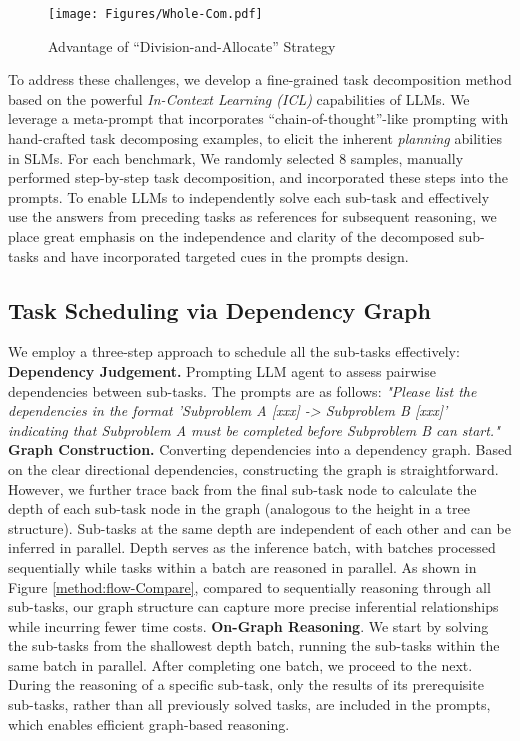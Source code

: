 \begin{figure}
    \centering
    \texttt{[image: Figures/Whole-Com.pdf]}
    \vspace{-6mm}
    \caption{Advantage of ``Division-and-Allocate'' Strategy}
    \label{fig:compare}
    \vspace{-5mm}
\end{figure}

To address these challenges, we develop a fine-grained task decomposition method based on the powerful \textit{In-Context Learning (ICL)} capabilities of LLMs. We leverage a meta-prompt that incorporates ``chain-of-thought''-like prompting with hand-crafted task decomposing examples, to elicit the inherent \emph{planning} abilities in SLMs. 
For each benchmark, We randomly selected 8 samples, manually performed step-by-step task decomposition, and incorporated these steps into the prompts.
To enable LLMs to independently solve each sub-task and effectively use the answers from preceding tasks as references for subsequent reasoning, we place great emphasis on the independence and clarity of the decomposed sub-tasks and have incorporated targeted cues in the prompts design.


\subsection{Task Scheduling via Dependency Graph}
\label{method:dep}
We employ a three-step approach to schedule all the sub-tasks effectively:
\textbf{Dependency Judgement.} Prompting LLM agent to assess pairwise dependencies between sub-tasks. The prompts are as follows: \textit{"Please list the dependencies in the format 'Subproblem A [xxx] -> Subproblem B [xxx]' indicating that Subproblem A must be completed before Subproblem B can start."}
\textbf{Graph Construction.} Converting dependencies into a dependency graph. Based on the clear directional dependencies, constructing the graph is straightforward. However, we further trace back from the final sub-task node to calculate the depth of each sub-task node in the graph (analogous to the height in a tree structure). Sub-tasks at the same depth are independent of each other and can be inferred in parallel. Depth serves as the inference batch, with batches processed sequentially while tasks within a batch are reasoned in parallel. As shown in Figure \ref{method:flow-Compare}, compared to sequentially reasoning through all sub-tasks, our graph structure can capture more precise inferential relationships while incurring fewer time costs.
\textbf{On-Graph Reasoning}. We start by solving the sub-tasks from the shallowest depth batch, running the sub-tasks within the same batch in parallel. After completing one batch, we proceed to the next. During the reasoning of a specific sub-task, only the results of its prerequisite sub-tasks, rather than all previously solved tasks, are included in the prompts, which enables efficient graph-based reasoning.











